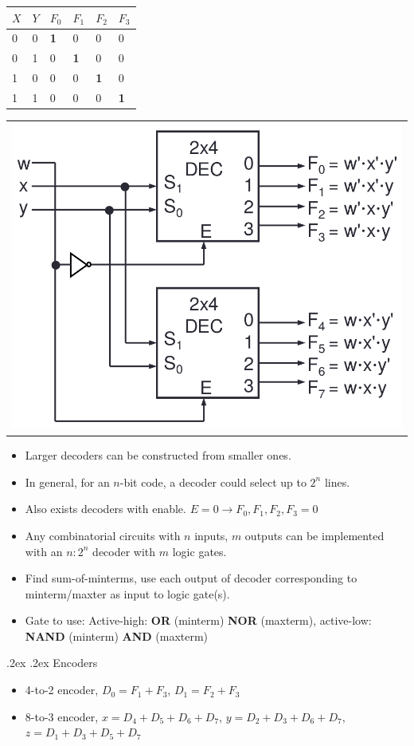 \documentclass[10pt,landscape,a4paper]{article}
\makeatletter
\renewcommand{\subsection}{\@startsection{subsection}{1}{0mm}%
                                {.2ex}%
                                {.2ex}%
                                {\sffamily\bfseries}}
\makeatother
\begin{document}
\begin{multicols*}{4}
  \begin{tabular}{| l l | l l l l |}
    \hline
    $X$ & $Y$ & $F_0$      & $F_1$      & $F_2$      & $F_3$      \\ \hline
    0   & 0   & \textbf{1} & 0          & 0          & 0          \\
    0   & 1   & 0          & \textbf{1} & 0          & 0          \\
    1   & 0   & 0          & 0          & \textbf{1} & 0          \\
    1   & 1   & 0          & 0          & 0          & \textbf{1} \\
    \hline
  \end{tabular}
  \begin{tabular}{l}
    \includegraphics[width=0.35\linewidth]{larger-decoder}
  \end{tabular}
  \begin{itemize}
    \item Larger decoders can be constructed from smaller ones.
    \item In general, for an $n$-bit code, a decoder could select up to $2^n$ lines.
    \item Also exists decoders with enable. $E=0 \rightarrow F_0, F_1, F_2, F_3 = 0$
    \item Any combinatorial circuits with $n$ inputs, $m$ outputs can be implemented with an $n:2^n$ decoder with $m$ logic gates.
    \item Find sum-of-minterms, use each output of decoder corresponding to minterm/maxter as input to logic gate(s).
    \item Gate to use: Active-high: \textbf{OR} (minterm) \textbf{NOR} (maxterm), active-low: \textbf{NAND} (minterm) \textbf{AND} (maxterm)
  \end{itemize}

  \subsection{Encoders}
  \begin{itemize}
    \item 4-to-2 encoder, $D_0 = F_1 + F_3$, $D_1=F_2+F_3$
    \item 8-to-3 encoder, $x=D_4+D_5+D_6+D_7$, $y=D_2+D_3+D_6+D_7$, $z=D_1+D_3+D_5+D_7$
  \end{itemize}


\end{multicols*}
\end{document}

